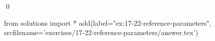 
\begin{ex}
  \label{ex:17-22-reference-parameters}
  
  \qed
\end{ex}
\begin{python0}
from solutions import *
add(label="ex:17-22-reference-parameters",
    srcfilename='exercises/17-22-reference-parameters/answer.tex')
\end{python0}
